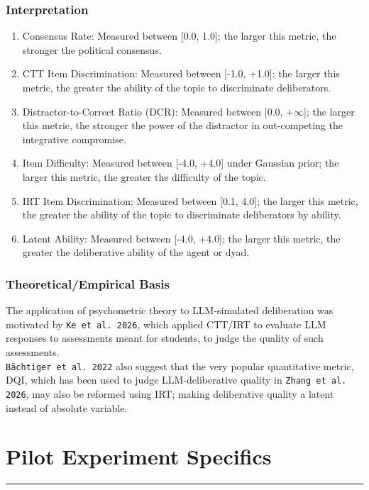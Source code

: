 \documentclass[titlepage]{article}
\begin{document}
\subsubsection{Interpretation}
\begin{enumerate}
    \item Consensus Rate: Measured between [0.0, 1.0]; the larger this metric, the stronger the political consensus.
    \item CTT Item Discrimination: Measured between [-1.0, +1.0]; the larger this metric, the greater the ability of the topic to discriminate deliberators.
    \item Distractor-to-Correct Ratio (DCR): Measured between [0.0, $+\infty$]; the larger this metric, the stronger the power of the distractor in out-competing the integrative compromise.
    \item Item Difficulty: Measured between [-4.0, +4.0] under Gaussian prior; the larger this metric, the greater the difficulty of the topic.
    \item IRT Item Discrimination: Measured between [0.1, 4.0]; the larger this metric, the greater the ability of the topic to discriminate deliberators by ability.
    \item Latent Ability: Measured between [-4.0, +4.0]; the larger this metric, the greater the deliberative ability of the agent or dyad.
\end{enumerate}

\subsubsection{Theoretical/Empirical Basis}
The application of psychometric theory to LLM-simulated deliberation was motivated by \texttt{Ke et al. 2026}, which applied CTT/IRT to evaluate LLM responses to assessments meant for students, to judge the quality of such assessments.\\

\texttt{Bächtiger et al. 2022} also suggest that the very popular quantitative metric, DQI, which has been used to judge LLM-deliberative quality in \texttt{Zhang et al. 2026}, may also be reformed using IRT; making deliberative quality a latent instead of absolute variable.

\newpage

\section{Pilot Experiment Specifics}
\label{sec:taskdescription}
\rule{\textwidth}{0.4pt}
\end{document}
